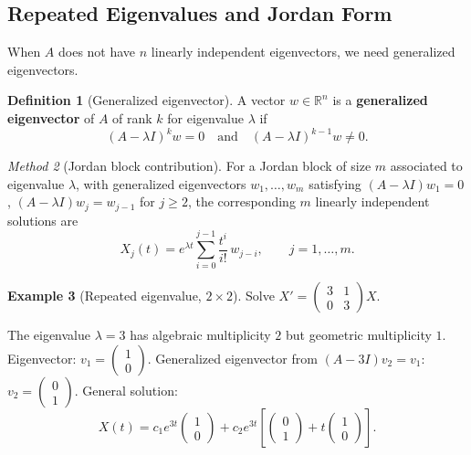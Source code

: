 \documentclass[12pt,a4paper,openany]{book}
\theoremstyle{definition}
\newtheorem{definition}{Definition}[chapter]
\newtheorem{example}[definition]{Example}
\theoremstyle{plain}
\theoremstyle{remark}
\newtheorem{method}[definition]{Method}
\newcommand{\R}{\mathbb{R}}
\begin{document}
\subsection{Repeated Eigenvalues and Jordan Form}\label{subsec:jordan}

When $A$ does not have $n$ linearly independent eigenvectors, we need
generalized eigenvectors.

\begin{definition}[Generalized eigenvector]\label{def:gen-eigenvector}
A vector $w\in\R^n$ is a \textbf{generalized eigenvector} of $A$ of
rank $k$ for eigenvalue $\lambda$ if
\[
  (A-\lambda I)^k w = 0 \quad\text{and}\quad (A-\lambda I)^{k-1}w \neq 0.
\]
\end{definition}

\begin{method}[Jordan block contribution]\label{meth:jordan-block}
For a Jordan block of size $m$ associated to eigenvalue $\lambda$,
with generalized eigenvectors $w_1,\dots,w_m$ satisfying
$(A-\lambda I)w_1=0$, $(A-\lambda I)w_j=w_{j-1}$ for $j\ge 2$,
the corresponding $m$ linearly independent solutions are
\begin{equation}\label{eq:jordan-solutions}
  X_j(t) = e^{\lambda t}\sum_{i=0}^{j-1}\frac{t^i}{i!}\,w_{j-i},
  \qquad j=1,\dots,m.
\end{equation}
\end{method}

\begin{example}[Repeated eigenvalue, $2\times 2$]\label{ex:repeated-2x2}
Solve $X' = \begin{pmatrix}3 & 1 \\ 0 & 3\end{pmatrix}X$.

The eigenvalue $\lambda=3$ has algebraic multiplicity $2$ but geometric
multiplicity $1$.  Eigenvector: $v_1=\begin{pmatrix}1\\0\end{pmatrix}$.
Generalized eigenvector from $(A-3I)v_2 = v_1$:
$v_2 = \begin{pmatrix}0\\1\end{pmatrix}$.
General solution:
\[
  X(t) = c_1 e^{3t}\begin{pmatrix}1\\0\end{pmatrix}
        + c_2 e^{3t}\left[\begin{pmatrix}0\\1\end{pmatrix}
        + t\begin{pmatrix}1\\0\end{pmatrix}\right].
\]
\end{example}
\end{document}
